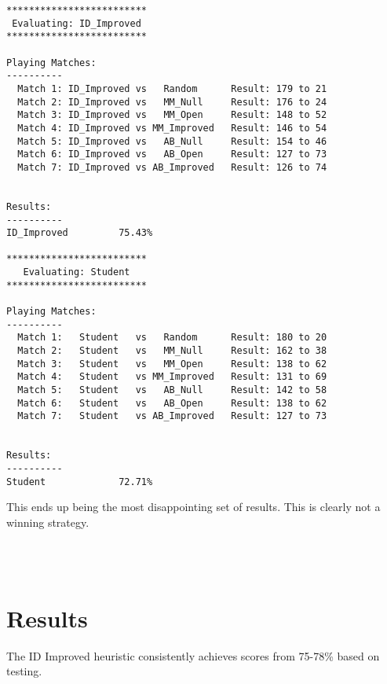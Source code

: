 \documentclass[10pt, a4paper]{article}
\begin{document}
\begin{verbatim}
*************************
 Evaluating: ID_Improved 
*************************

Playing Matches:
----------
  Match 1: ID_Improved vs   Random    	Result: 179 to 21
  Match 2: ID_Improved vs   MM_Null   	Result: 176 to 24
  Match 3: ID_Improved vs   MM_Open   	Result: 148 to 52
  Match 4: ID_Improved vs MM_Improved 	Result: 146 to 54
  Match 5: ID_Improved vs   AB_Null   	Result: 154 to 46
  Match 6: ID_Improved vs   AB_Open   	Result: 127 to 73
  Match 7: ID_Improved vs AB_Improved 	Result: 126 to 74


Results:
----------
ID_Improved         75.43%

*************************
   Evaluating: Student   
*************************

Playing Matches:
----------
  Match 1:   Student   vs   Random    	Result: 180 to 20
  Match 2:   Student   vs   MM_Null   	Result: 162 to 38
  Match 3:   Student   vs   MM_Open   	Result: 138 to 62
  Match 4:   Student   vs MM_Improved 	Result: 131 to 69
  Match 5:   Student   vs   AB_Null   	Result: 142 to 58
  Match 6:   Student   vs   AB_Open   	Result: 138 to 62
  Match 7:   Student   vs AB_Improved 	Result: 127 to 73


Results:
----------
Student             72.71%
\end{verbatim}

This ends up being the most disappointing set of results.  This is clearly not
a winning strategy.

\section{}

\begin{lstlisting}[language=Python]
\end{lstlisting}

\begin{verbatim}
\end{verbatim}

\section{Results}

The ID Improved heuristic consistently achieves scores from 75-78\% based on testing.
\end{document}

